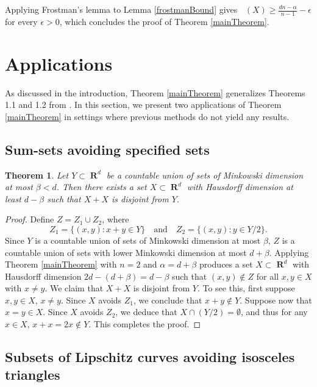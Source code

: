 \documentclass[dvipsnames,letterpaper,12pt]{article}
\numberwithin{equation}{section}
\theoremstyle{plain}
\newtheorem{theorem}{Theorem}
\theoremstyle{remark}
\DeclareMathOperator{\hausdim}{\dim_{\mathbf{H}}}
\DeclareMathOperator{\RR}{\mathbf{R}}
\DeclareMathOperator{\setcolon}{\colon}
\begin{document}
Applying Frostman's lemma to Lemma \ref{frostmanBound} gives $\hausdim(X) \geq \frac{dn - \alpha}{n - 1} - \epsilon$ for every $\epsilon>0$, which concludes the proof of Theorem \ref{mainTheorem}.



\section{Applications}\label{applications}

As discussed in the introduction, Theorem \ref{mainTheorem} generalizes Theorems 1.1 and 1.2 from \cite{MalabikaRob}. In this section, we present two applications of Theorem \ref{mainTheorem} in settings where previous methods do not yield any results.

\subsection{Sum-sets avoiding specified sets}

\begin{theorem} \label{sumset-application} 
	Let $Y \subset \RR^d$ be a countable union of sets of Minkowski dimension at most $\beta < d$. Then there exists a set $X \subset \RR^d$ with Hausdorff dimension at least $d - \beta$ such that $X + X$ is disjoint from $Y$.
\end{theorem}
\begin{proof}
	Define $Z = Z_1 \cup Z_2$, where
	\[ Z_1 = \{ (x,y) \setcolon x + y \in Y \} \quad \text{and} \quad Z_2 = \{ (x,y) \setcolon y \in Y/2 \}. \]
	Since $Y$ is a countable union of sets of Minkowski dimension at most $\beta$, $Z$ is a countable union of sets with lower Minkowski dimension at most $d + \beta$. Applying Theorem \ref{mainTheorem} with $n = 2$ and $\alpha = d + \beta$ produces a set $X \subset \RR^d$ with Hausdorff dimension $2d  - (d + \beta) = d - \beta$ such that $(x,y) \not \in Z$ for all $x,y \in X$ with $x \neq y$. We claim that $X+ X$ is disjoint from $Y$. To see this, first suppose $x, y \in X$, $x \ne y$. Since $X$ avoids $Z_1$, we conclude that $x + y \not \in Y$. Suppose now that $x = y \in X$. Since $X$ avoids $Z_2$, we deduce that $X \cap (Y/2) = \emptyset$, and thus for any $x \in X$, $x + x = 2x \not \in Y$. This completes the proof.
\end{proof}


\subsection{Subsets of Lipschitz curves avoiding isosceles triangles}
\end{document}
